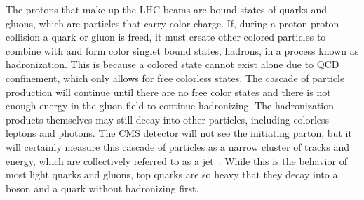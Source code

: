 The protons that make up the LHC beams are bound states of quarks and gluons, which are particles that carry color charge.
If, during a proton-proton collision a quark or gluon is freed, it must create other colored particles to combine with and form color singlet bound states, hadrons, in a process known as hadronization.
This is because a colored state cannot exist alone due to QCD confinement, which only allows for free colorless states.
The cascade of particle production will continue until there are no free color states and there is not enough energy in the gluon field to continue hadronizing.
The hadronization products themselves may still decay into other particles, including colorless leptons and photons.
The CMS detector will not see the initiating parton, but it will certainly measure this cascade of particles as a narrow cluster of tracks and energy, which are collectively referred to as a jet~\cite{Salam:2009jx}.
While this is the behavior of most light quarks and gluons, top quarks are so heavy that they decay into a \PW boson and a \cPqb quark without hadronizing first.

